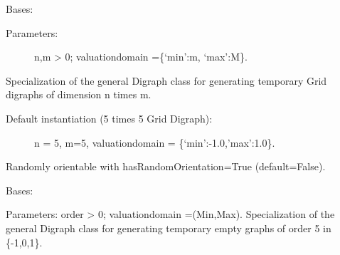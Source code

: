 \documentclass[letterpaper,10pt,english]{sphinxmanual}
\begin{document}
\begin{fulllineitems}
\label{techDoc:digraphs.GridDigraph}
Bases: {\hyperref[techDoc:digraphs.Digraph]{\emph{}}}
\begin{description}
\item[{Parameters:}] \leavevmode
n,m \textgreater{} 0; valuationdomain =\{`min':m, `max':M\}.

\end{description}

Specialization of the general Digraph class for generating
temporary Grid digraphs of dimension n times m.
\begin{description}
\item[{Default instantiation (5 times 5 Grid Digraph):}] \leavevmode
n = 5, m=5, valuationdomain = \{`min':-1.0,'max':1.0\}.

\end{description}

Randomly orientable with hasRandomOrientation=True (default=False).

\begin{fulllineitems}
\label{techDoc:digraphs.GridDigraph.showShort}
\end{fulllineitems}


\end{fulllineitems}


\begin{fulllineitems}
\label{techDoc:digraphs.IndeterminateDigraph}
Bases: {\hyperref[techDoc:digraphs.Digraph]{\emph{}}}

Parameters: order \textgreater{} 0; valuationdomain =(Min,Max).
Specialization of the general Digraph class for generating
temporary empty graphs of order 5 in \{-1,0,1\}.

\end{fulllineitems}

\end{document}
